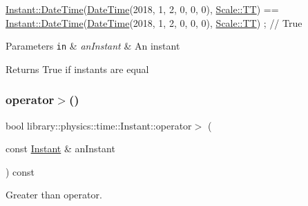 \begin{DoxyCode}
\hyperlink{classlibrary_1_1physics_1_1time_1_1_instant_ac827b6ffa57ce75a3c56c462d4c872f8}{Instant::DateTime}(\hyperlink{classlibrary_1_1physics_1_1time_1_1_instant_ac827b6ffa57ce75a3c56c462d4c872f8}{DateTime}(2018, 1, 2, 0, 0, 0), 
      \hyperlink{namespacelibrary_1_1physics_1_1time_a09d2bc9fbc7b0b5f92e1419bd655e6bbadf1f3edb9115acb0a1e04209b7a9937b}{Scale::TT}) == \hyperlink{classlibrary_1_1physics_1_1time_1_1_instant_ac827b6ffa57ce75a3c56c462d4c872f8}{Instant::DateTime}(\hyperlink{classlibrary_1_1physics_1_1time_1_1_instant_ac827b6ffa57ce75a3c56c462d4c872f8}{DateTime}(2018, 1, 2, 0, 0, 0), 
      \hyperlink{namespacelibrary_1_1physics_1_1time_a09d2bc9fbc7b0b5f92e1419bd655e6bbadf1f3edb9115acb0a1e04209b7a9937b}{Scale::TT}) ; \textcolor{comment}{// True}
\end{DoxyCode}



\begin{DoxyParams}[1]{Parameters}
\mbox{\tt in}  & {\em an\+Instant} & An instant \\
\hline
\end{DoxyParams}
\begin{DoxyReturn}{Returns}
True if instants are equal 
\end{DoxyReturn}
\mbox{\label{classlibrary_1_1physics_1_1time_1_1_instant_ad9ddedc5a5ce3d69894577dbd34bb6ce}} 
\subsubsection{\texorpdfstring{operator$>$()}{operator>()}}
{\footnotesize\ttfamily bool library\+::physics\+::time\+::\+Instant\+::operator$>$ (\begin{DoxyParamCaption}\item[{const \hyperlink{classlibrary_1_1physics_1_1time_1_1_instant}{Instant} \&}]{an\+Instant }\end{DoxyParamCaption}) const}



Greater than operator. 


